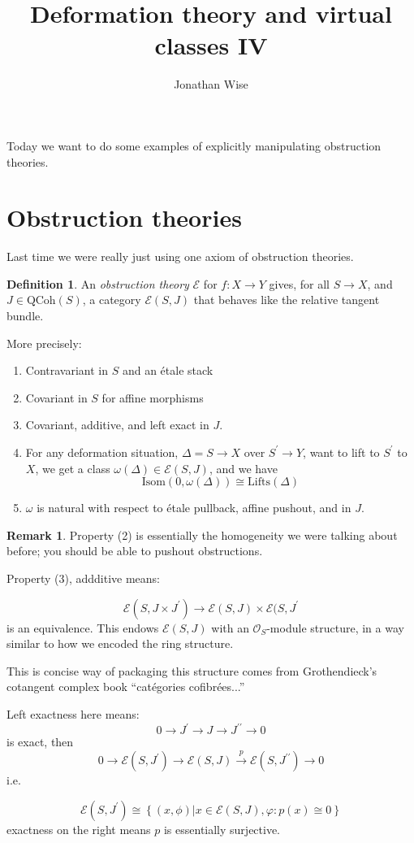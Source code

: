 \documentclass{amsart}
\author{Jonathan Wise}
\title{Deformation theory and virtual classes IV}
\theoremstyle{definition}
\newtheorem{remark}[dummy]{Remark}
\newtheorem{definition}[dummy]{Definition}
\newcommand{\OO}{\mathcal{O}}
\begin{document}
\maketitle
Today we want to do some examples of explicitly manipulating obstruction theories.


\section{Obstruction theories}
Last time we were really just using one axiom of obstruction theories.

\begin{definition}
An \emph{obstruction theory} $\mathcal{E}$ for $f:X\to Y$ gives, for all $S\to X$, and $J\in \text{QCoh}(S)$, a category $\mathcal{E}(S,J)$ that behaves like the relative tangent bundle.

More precisely:
\begin{enumerate}
\item Contravariant in $S$ and an \'etale stack
\item Covariant in $S$ for affine morphisms
\item Covariant, additive, and left exact in $J$.
\item For any deformation situation, $\Delta=S\to X$ over $S^\prime\to Y$, want to lift to $S^\prime$ to $X$, we get a class $\omega(\Delta)\in \mathcal{E}(S,J)$, and we have
$$\text{Isom}(0, \omega(\Delta))\cong \text{Lifts}(\Delta)$$
\item $\omega$ is natural with respect to \'etale pullback, affine pushout, and in $J$.
\end{enumerate}

\end{definition}
\begin{remark}
Property (2) is essentially the homogeneity we were talking about before; you should be able to pushout obstructions.

Property (3), addditive means:

$$\mathcal{E}(S, J\times J^\prime)\to \mathcal{E}(S, J)\times \mathcal{E}(S, J^\prime$$
is an equivalence.  This endows $\mathcal{E}(S, J)$ with an $\OO_S$-module structure, in a way similar to how we encoded the ring structure.

This is concise way of packaging this structure comes from Grothendieck's cotangent complex book ``cat\'egories cofibr\'ees...'' 

Left exactness here means:
$$0\to J^\prime\to J \to J^{\prime\prime}\to 0$$
is exact, then
$$0\to \mathcal{E}(S, J^\prime)\to\mathcal{E}(S, J) \stackrel{p}\to \mathcal{E}(S,J^{\prime\prime})\to 0$$
i.e.

$$\mathcal{E}(S, J^\prime)\cong\left\{ (x,\phi)\Big | x\in\mathcal{E}(S, J), \varphi:p(x)\cong 0\right\}$$
exactness on the right means $p$ is essentially surjective.  
\end{remark}
\end{document}
